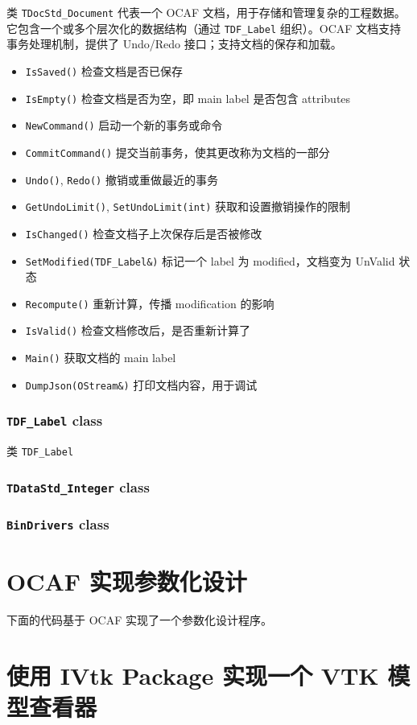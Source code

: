 \documentclass[11pt]{article}
\let\oldsection\section
\renewcommand{\section}{\clearpage\oldsection}
\begin{document}
类 \texttt{TDocStd\_Document} 代表一个 OCAF 文档，用于存储和管理复杂的工程数据。它包含一个或多个层次化的数据结构（通过 \texttt{TDF\_Label} 组织）。OCAF 文档支持事务处理机制，提供了 Undo/Redo 接口；支持文档的保存和加载。

\begin{itemize}
\item \texttt{IsSaved()} 检查文档是否已保存
\item \texttt{IsEmpty()} 检查文档是否为空，即 main label 是否包含 attributes
\item \texttt{NewCommand()} 启动一个新的事务或命令
\item \texttt{CommitCommand()} 提交当前事务，使其更改称为文档的一部分
\item \texttt{Undo()}, \texttt{Redo()} 撤销或重做最近的事务
\item \texttt{GetUndoLimit()}, \texttt{SetUndoLimit(int)} 获取和设置撤销操作的限制
\item \texttt{IsChanged()} 检查文档子上次保存后是否被修改
\item \texttt{SetModified(TDF\_Label\&)} 标记一个 label 为 modified，文档变为 UnValid 状态
\item \texttt{Recompute()} 重新计算，传播 modification 的影响
\item \texttt{IsValid()} 检查文档修改后，是否重新计算了
\item \texttt{Main()} 获取文档的 main label
\item \texttt{DumpJson(OStream\&)} 打印文档内容，用于调试
\end{itemize}
\subsubsection{\texttt{TDF\_Label} class}
\label{sec:orgbffcc0e}

类 \texttt{TDF\_Label}
\subsubsection{\texttt{TDataStd\_Integer} class}
\label{sec:org78aeeaf}

\subsubsection{\texttt{BinDrivers} class}
\label{sec:org2b84a13}
\section{OCAF 实现参数化设计}
\label{sec:org6fd0970}

下面的代码基于 OCAF 实现了一个参数化设计程序。
\section{使用 IVtk Package 实现一个 VTK 模型查看器}
\label{sec:orgfece859}
\end{document}
